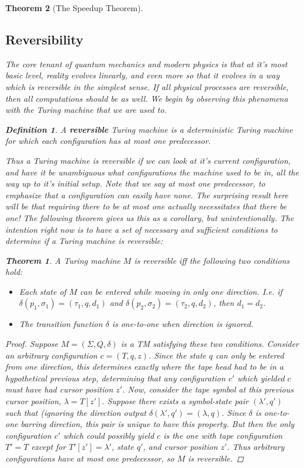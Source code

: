 \documentclass{article}
\theoremstyle{definition}
\newtheorem{definition}{Definition}[section]
\theoremstyle{plain}
\theoremstyle{theorem}
\newtheorem{theorem}{Theorem}[section]
\begin{document}
\begin{theorem}[The Speedup Theorem]
\subsection{Reversibility}
The core tenant of quantum mechanics and modern physics is that at it's most basic level, reality evolves linearly, and even more so that it evolves in a way which is reversible in the simplest sense. If all physical processes are reversible, then all computations should be as well. We begin by observing this phenomena with the Turing machine that we are used to. 
\begin{definition}
	A \textbf{reversible} Turing machine is a deterministic Turing machine for which each configuration has at most one predecessor. 
\end{definition}
Thus a Turing machine is reversible if we can look at it's current configuration, and have it be unambiguous what configurations the machine used to be in, all the way up to it's initial setup. Note that we say \textit{at most} one predecessor, to emphasize that a configuration can easily have none. The surprising result here will be that requiring there to be at most one actually necessitates that there be one! The following theorem gives us this as a corollary, but unintentionally. The intention right now is to have a set of necessary and sufficient conditions to determine if a Turing machine is reversible:
\begin{theorem}
	A Turing machine $M$ is reversible iff the following two conditions hold:
	\begin{itemize}
	\item[1.] Each state of $M$ can be entered while moving in only one direction. I.e. if $\delta(p_1,\sigma_1) = (\tau_1,q,d_1)$ and $\delta(p_2,\sigma_2) = (\tau_2,q,d_2)$, then $d_1 = d_2$.
	\item[2.] The transition function $\delta$ is one-to-one when direction is ignored. 
	\end{itemize}
\end{theorem}
\begin{proof}
	Suppose $M = (\Sigma,Q,\delta)$ is a TM satisfying these two conditions. Consider an arbitrary configuration $c = (T,q,z)$. Since the state $q$ can only be entered from one direction, this determines exactly where the tape head had to be in a hypothetical previous step, determining that any configuration $c'$ which yielded $c$ must have had cursor position $z'$. Now, consider the tape symbol at this previous cursor position, $\lambda = T[z']$. Suppose there exists a symbol-state pair $(\lambda',q')$ such that (ignoring the direction output $\delta(\lambda',q') = (\lambda,q)$. Since $\delta$ is one-to-one barring direction, this pair is unique to have this property. But then the only configuration $c'$ which could possibly yield $c$ is the one with tape configuration $T' = T$ except for $T'[z'] = \lambda'$, state $q'$, and cursor position $z'$. Thus arbitrary configurations have at most one predecessor, so $M$ is reversible.

\end{proof}
\end{theorem}
\end{document}
